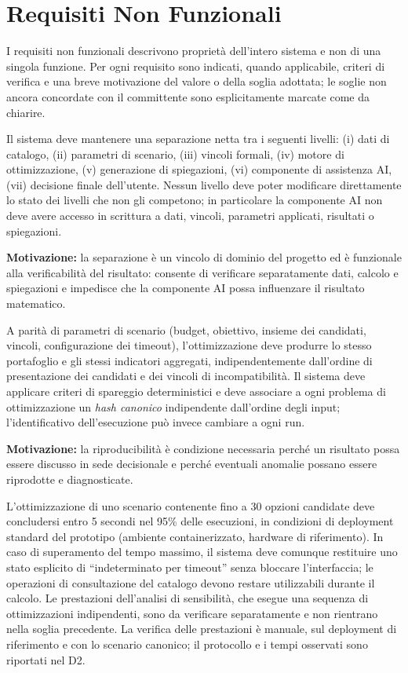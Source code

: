 \section{Requisiti Non Funzionali}
\label{sec:RNF}

I requisiti non funzionali descrivono proprietà dell'intero sistema e non di una singola funzione. Per ogni requisito sono indicati, quando applicabile, criteri di verifica e una breve motivazione del valore o della soglia adottata; le soglie non ancora concordate con il committente sono esplicitamente marcate come da chiarire.

 \label{rnf:isolamento}
Il sistema deve mantenere una separazione netta tra i seguenti livelli: (i) dati di catalogo, (ii) parametri di scenario, (iii) vincoli formali, (iv) motore di ottimizzazione, (v) generazione di spiegazioni, (vi) componente di assistenza AI, (vii) decisione finale dell'utente. Nessun livello deve poter modificare direttamente lo stato dei livelli che non gli competono; in particolare la componente AI non deve avere accesso in scrittura a dati, vincoli, parametri applicati, risultati o spiegazioni.

\textbf{Motivazione:} la separazione è un vincolo di dominio del progetto ed è funzionale alla verificabilità del risultato: consente di verificare separatamente dati, calcolo e spiegazioni e impedisce che la componente AI possa influenzare il risultato matematico.

 \label{rnf:determinismo}
A parità di parametri di scenario (budget, obiettivo, insieme dei candidati, vincoli, configurazione dei timeout), l'ottimizzazione deve produrre lo stesso portafoglio e gli stessi indicatori aggregati, indipendentemente dall'ordine di presentazione dei candidati e dei vincoli di incompatibilità. Il sistema deve applicare criteri di spareggio deterministici e deve associare a ogni problema di ottimizzazione un \emph{hash canonico} indipendente dall'ordine degli input; l'identificativo dell'esecuzione può invece cambiare a ogni run.

\textbf{Motivazione:} la riproducibilità è condizione necessaria perché un risultato possa essere discusso in sede decisionale e perché eventuali anomalie possano essere riprodotte e diagnosticate.

 \label{rnf:prestazioni}
L'ottimizzazione di uno scenario contenente fino a 30 opzioni candidate deve concludersi entro 5 secondi nel 95\% delle esecuzioni, in condizioni di deployment standard del prototipo (ambiente containerizzato, hardware di riferimento). In caso di superamento del tempo massimo, il sistema deve comunque restituire uno stato esplicito di ``indeterminato per timeout'' senza bloccare l'interfaccia; le operazioni di consultazione del catalogo devono restare utilizzabili durante il calcolo. Le prestazioni dell'analisi di sensibilità, che esegue una sequenza di ottimizzazioni indipendenti, sono da verificare separatamente e non rientrano nella soglia precedente. La verifica delle prestazioni è manuale, sul deployment di riferimento e con lo scenario canonico; il protocollo e i tempi osservati sono riportati nel D2.

